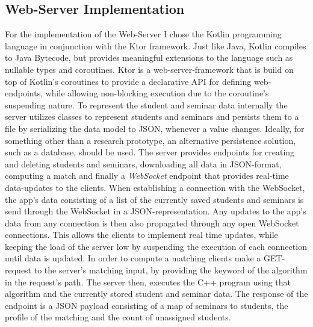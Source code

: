 \subsection{Web-Server Implementation}
For the implementation of the Web-Server I chose the Kotlin programming language in conjunction with the Ktor framework. Just like Java, Kotlin compiles to Java Bytecode, but provides meaningful extensions to the language such as nullable types and coroutines. Ktor is a web-server-framework that is build on top of Kotlin's coroutines to provide a declarative API for defining web-endpoints, while allowing non-blocking execution due to the coroutine's suspending nature. 
To represent the student and seminar data internally the server utilizes classes to represent students and seminars and persists them to a file by serializing the data model to JSON, whenever a value changes. Ideally, for something other than a research prototype, an alternative persistence solution, such as a database, should be used. The server provides endpoints for creating and deleting students and seminars, downloading all data in JSON-format, computing a match and finally a \textit{WebSocket} endpoint that provides real-time data-updates to the clients. When establishing a connection with the WebSocket, the app's data consisting of a list of the currently saved students and seminars is send through the WebSocket in a JSON-representation. Any updates to the app's data from any connection is then also propagated through any open WebSocket connections. This allows the clients to implement real time updates, while keeping the load of the server low by suspending the execution of each connection until data is updated. In order to compute a matching clients make a GET-request to the server's matching input, by providing the keyword of the algorithm in the request's path. The server then, executes the C++ program using that algorithm and the currently stored student and seminar data. The response of the endpoint is a JSON payload consisting of a map of seminars to students, the profile of the matching and the count of unassigned students.

